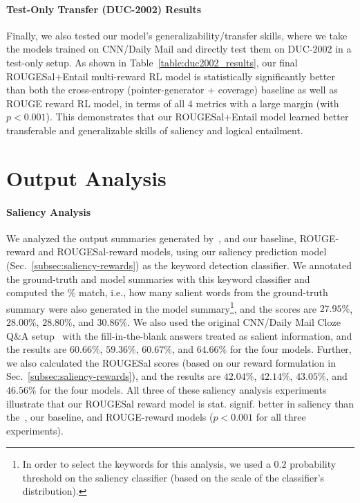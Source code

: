 \documentclass[11pt,a4paper]{article}
\begin{document}
\paragraph{Test-Only Transfer (DUC-2002) Results} 
Finally, we also tested our model's generalizability/transfer skills, where we take the models trained on CNN/Daily Mail and directly test them on DUC-2002 in a test-only setup. As shown in Table~\ref{table:duc2002_results}, our final ROUGESal+Entail multi-reward RL model is statistically significantly better than both the cross-entropy (pointer-generator + coverage) baseline as well as ROUGE reward RL model, in terms of all 4 metrics with a large margin (with $p<0.001$). This demonstrates that our ROUGESal+Entail model learned better transferable and generalizable skills of saliency and logical entailment.








 
\section{Output Analysis}
\label{sec:analysis}

\paragraph{Saliency Analysis} We analyzed the output summaries generated by~, and our baseline, ROUGE-reward and ROUGESal-reward models, using our saliency prediction model (Sec.~\ref{subsec:saliency-rewards}) as the keyword detection classifier. We annotated the ground-truth and model summaries with this keyword classifier and computed the \% match, i.e., how many salient words from the ground-truth summary were also generated in the model summary\footnote{In order to select the keywords for this analysis, we used a $0.2$ probability threshold on the saliency classifier (based on the scale of the classifier's distribution).}, and the scores are $27.95\%$, $28.00\%$, $28.80\%$, and $30.86\%$. We also used the original CNN/Daily Mail Cloze Q\&A setup~\cite{hermann2015teaching} with the fill-in-the-blank answers treated as salient information, and the results are $60.66\%$, $59.36\%$, $60.67\%$, and $64.66\%$ for the four models. Further, we also calculated the ROUGESal scores (based on our reward formulation in Sec.~\ref{subsec:saliency-rewards}), and the results are $42.04\%$, $42.14\%$, $43.05\%$, and $46.56\%$ for the four models. All three of these saliency analysis experiments illustrate that our ROUGESal reward model is stat. signif. better in saliency than the~, our baseline, and ROUGE-reward models ($p<0.001$ for all three experiments).
\end{document}
